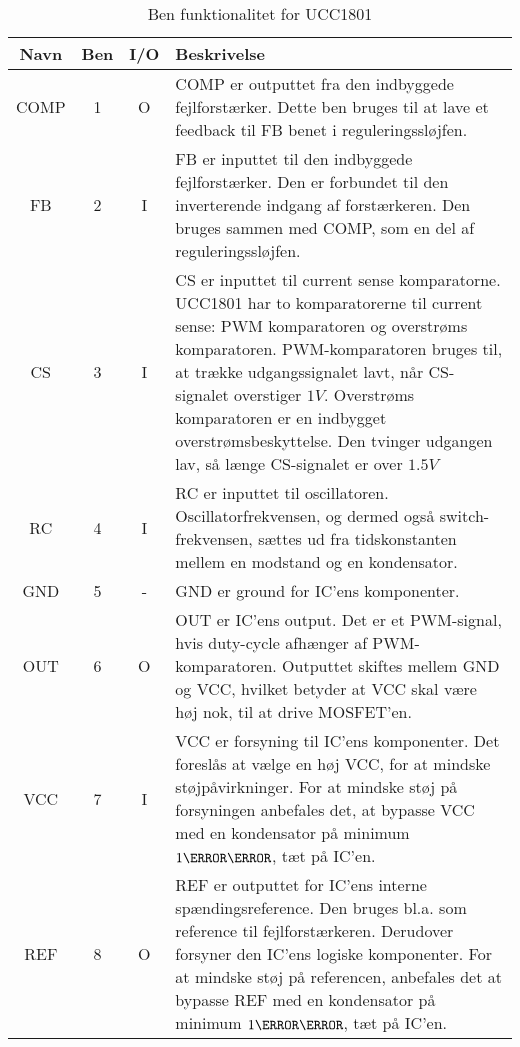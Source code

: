 \begin{table}[H] 			
	\centering
	\begin{tabularx}{\textwidth}{|c|c|c|X|} 
		\hline
		\textbf{Navn} & \textbf{Ben} & \textbf{I/O} & \textbf{Beskrivelse} \\ \hline
		COMP & 1 & O & COMP er outputtet fra den indbyggede fejlforstærker. Dette ben bruges til at lave et feedback til FB benet i reguleringssløjfen. 	\\ \hline
		FB 	 & 2 & I & FB er inputtet til den indbyggede fejlforstærker. Den er forbundet til den inverterende indgang af forstærkeren. Den bruges sammen med COMP, som en del af reguleringssløjfen.\\ \hline
		CS   & 3 & I & CS er inputtet til current sense komparatorne. UCC1801 har to komparatorerne til current sense: PWM komparatoren og overstrøms komparatoren. PWM-komparatoren bruges til, at trække udgangssignalet lavt, når CS-signalet overstiger $1V$. Overstrøms komparatoren er en indbygget overstrømsbeskyttelse. Den tvinger udgangen lav, så længe CS-signalet er over $1.5V$ \\ \hline
		RC 	 & 4 & I & RC er inputtet til oscillatoren. Oscillatorfrekvensen, og dermed også switch-frekvensen, sættes ud fra tidskonstanten mellem en modstand og en kondensator.  \\ \hline
		GND  & 5 & - & GND er ground for IC'ens komponenter.  \\ \hline
		OUT  & 6 & O & OUT er IC'ens output. Det er et PWM-signal, hvis duty-cycle afhænger af PWM-komparatoren. Outputtet skiftes mellem GND og VCC, hvilket betyder at VCC skal være høj nok, til at drive MOSFET'en.  \\ \hline
		VCC  & 7 & I & VCC er forsyning til IC'ens komponenter. Det foreslås at vælge en høj VCC, for at mindske støjpåvirkninger. For at mindske støj på forsyningen anbefales det, at bypasse VCC med en kondensator på minimum $1\micro \farad$, tæt på IC'en. \\ \hline
		REF  & 8 & O & REF er outputtet for IC'ens interne spændingsreference. Den bruges bl.a. som reference til fejlforstærkeren. Derudover forsyner den IC'ens logiske komponenter. For at mindske støj på referencen, anbefales det at bypasse REF med en kondensator på minimum $1\micro \farad$, tæt på IC'en. \\ \hline
	\end{tabularx}
	
	\caption{Ben funktionalitet for UCC1801}
	\label{tab:ucc1801_pin_functionality}
\end{table}

